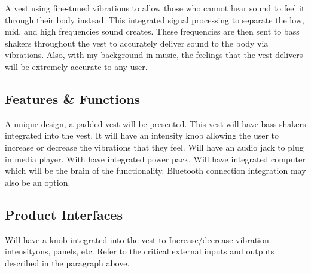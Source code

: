 A vest using fine-tuned vibrations to allow those who cannot hear sound to feel it through their body instead. This integrated signal processing to separate the low, mid, and high frequencies sound creates. These frequencies are then sent to bass shakers throughout the vest to accurately deliver sound to the body via vibrations. Also, with my background in music, the feelings that the vest delivers will be extremely accurate to any user.

\subsection{Features \& Functions}
A unique design, a padded vest will be presented. This vest will have bass shakers integrated into the vest. It will have an intensity knob allowing the user to increase or decrease the vibrations that they feel. Will have an audio jack to plug in media player. With have integrated power pack. Will have integrated computer which will be the brain of the functionality. Bluetooth connection integration may also be an option.

\subsection{Product Interfaces}
Will have a knob integrated into the vest to Increase/decrease vibration intensityons, panels, etc. Refer to the critical external inputs and outputs described in the paragraph above.
